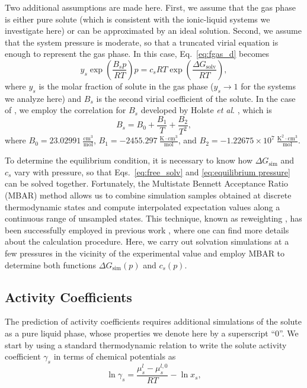 \documentclass[3p,twocolumn]{elsarticle}
\begin{document}
Two additional assumptions are made here. First, we assume that the gas phase is either pure solute (which is consistent with the ionic-liquid systems we investigate here) or can be approximated by an ideal solution. Second, we assume that the system pressure is moderate, so that a truncated virial equation is enough to represent the gas phase. In this case, Eq.~\eqref{eq:fgas_d} becomes
\begin{equation}
\label{eq:equilibrium pressure}
y_s \exp\left( \frac{B_s p}{R T} \right) p = c_s R T \exp \left( \frac{\Delta G_\text{solv}}{R T} \right),
\end{equation}
where $y_s$ is the molar fraction of solute in the gas phase ($y_s \rightarrow 1$ for the systems we analyze here) and $B_s$ is the second virial coefficient of the solute.
In the case of , we employ the correlation for $B_s$ developed by Holste \textit{et al}. \cite{Holste_1987}, which is
\begin{equation}
B_s = B_0 + \frac{B_1}{T} + \frac{B_2}{T^2},
\end{equation}
where $B_0 = 23.02991~\mathrm{\frac{cm^3}{mol}}$, $B_1 = -2455.297~\mathrm{\frac{K \cdot cm^3}{mol}}$, and $B_2 = -1.22675 \times 10^7~\mathrm{\frac{K^2 \cdot cm^3}{mol}}$.

To determine the equilibrium condition, it is necessary to know how $\Delta G_{\text{sim}}$ and $c_s$ vary with pressure, so that Eqs.~\eqref{eq:free_solv} and \eqref{eq:equilibrium pressure} can be solved together.
Fortunately, the Multistate Bennett Acceptance Ratio (MBAR) method \cite{Shirts_2008} allows us to combine simulation samples obtained at discrete thermodynamic states and compute interpolated expectation values along a continuous range of unsampled states.
This technique, known as reweighting \cite{McDonald1967,McDonald1969}, has been successfully employed in previous work \cite{Aimoli2014, Nichele2018, Schieber2018}, where one can find more details about the calculation procedure.
Here, we carry out solvation simulations at a few pressures in the vicinity of the experimental value and employ MBAR to determine both functions $\Delta G_{\text{sim}}(p)$ and $c_s(p)$.

\subsection*{Activity Coefficients}

The prediction of activity coefficients requires additional simulations of the solute as a pure liquid phase, whose properties we denote here by a superscript ``$0$''.
We start by using a standard thermodynamic relation \cite{Tester} to write the solute activity coefficient $\gamma_s$ in terms of chemical potentials as
\begin{equation}
\ln \gamma_s = \frac{\mu_s^l - \mu_s^{l,0}}{R T} - \ln x_s,
\end{equation}
\end{document}
